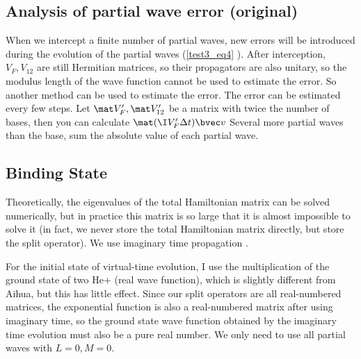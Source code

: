 \subsection{Analysis of partial wave error (original)}
When we intercept a finite number of partial waves, new errors will be introduced during the evolution of the partial waves (\autoref{test3_eq4} ). After interception, $V_F, V_{12}$ are still Hermitian matrices, so their propagators are also unitary, so the modulus length of the wave function cannot be used to estimate the error. So another method can be used to estimate the error. The error can be estimated every few steps. Let $\mat V'_F, \mat V'_{12}$ be a matrix with twice the number of bases, then you can calculate $\mat (\I V'_F\Delta t) \bvec v$ Several more partial waves than the base, sum the absolute value of each partial wave.


\subsection{Binding State}
Theoretically, the eigenvalues ​​of the total Hamiltonian matrix can be solved numerically, but in practice this matrix is ​​so large that it is almost impossible to solve it (in fact, we never store the total Hamiltonian matrix directly, but store the split operator). We use imaginary time propagation  .

For the initial state of virtual-time evolution, I use the multiplication of the ground state of two He+ (real wave function), which is slightly different from Aihua, but this has little effect. Since our split operators are all real-numbered matrices, the exponential function is also a real-numbered matrix after using imaginary time, so the ground state wave function obtained by the imaginary time evolution must also be a pure real number.
We only need to use all partial waves with $L = 0, M = 0$.


